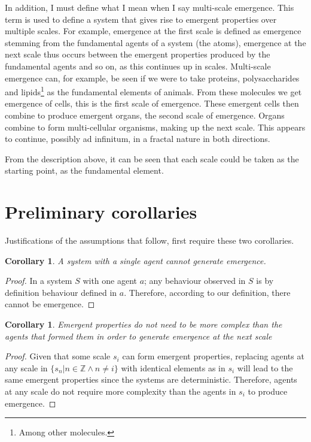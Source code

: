 \documentclass{article}
\newtheorem{corollary}[theorem]{Corollary}
\begin{document}
 In addition, I must define what I mean when I say multi-scale emergence. This term is used to define a system that gives rise to emergent properties over multiple scales. For example, emergence at the first scale is defined as emergence stemming from the fundamental agents of a system (the atoms), emergence at the next scale thus occurs between the emergent properties produced by the fundamental agents and so on, as this continues up in scales. Multi-scale emergence can, for example, be seen if we were to take proteins, polysaccharides and lipids\footnote{Among other molecules.} as the fundamental elements of animals. From these molecules  we get emergence of cells, this is the first scale of emergence. These emergent cells then combine to produce emergent organs, the second scale of emergence. Organs combine to form multi-cellular organisms, making up the next scale. This appears to continue, possibly ad infinitum, in a fractal nature in both directions. 

  From the description above, it can be seen that each scale could be taken as the starting point, as the fundamental element. 
  

\section{Preliminary corollaries}
  
Justifications of the assumptions that follow, first require these two corollaries.  

  \begin{corollary}
    A system with a single agent cannot generate emergence.
  \label{col:single_agent}
  \end{corollary}
  \begin{proof}

   In a system $S$ with one agent $a$; any behaviour observed in $S$ is by definition behaviour defined in $a$. Therefore, according to our definition, there cannot be emergence. 

  \end{proof}


  \begin{corollary}
    Emergent properties do not need to be more complex than the agents that formed them in order to generate emergence at the next scale
    \label{col:emer_level}
  \end{corollary}
  \begin{proof}

    Given that some scale $s_i$ can form emergent properties, replacing agents at any scale in $\{s_n | n \in \mathbb{Z} \wedge n \not = i \}$ with identical elements as in $s_i$ will lead to the same emergent properties since the systems are deterministic. Therefore, agents at any scale do not require more complexity than the agents in $s_i$ to produce emergence.

  \end{proof}
\end{document}
